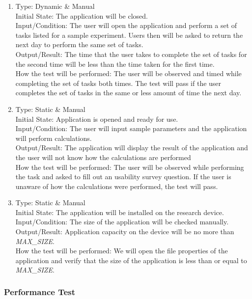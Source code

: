 \documentclass[12pt, titlepage]{article}
\begin{document}
\begin{adjustwidth}{2.2em}{0pt}
\begin{enumerate}[{NF-UT}1.]
  \item Type: Dynamic \& Manual\\ \label{UT4}
  Initial State: The application will be closed.\\
  Input/Condition: The user will open the application and perform a set of tasks listed for a sample experiment. Users then will be asked to return the next day to perform the same set of tasks.\\
  Output/Result:  The time that the user takes to complete the set of tasks for the second time will be less than the time taken for the first time.\\
  How the test will be performed: The user will be observed and timed while completing the set of tasks both times. The test will pass if the user completes the set of tasks in the same or less amount of time the next day.

  \item Type: Static \& Manual\\ \label{UT5}
  Initial State: Application is opened and ready for use.\\
  Input/Condition: The user will input sample parameters and the application will perform calculations.\\
  Output/Result: The application will display the result of the application and the user will not know how the calculations are performed \\
  How the test will be performed: The user will be observed while performing the task and asked to fill out an usability survey question. If the user is unaware of how the calculations were performed, the test will pass.

  \item Type: Static \& Manual\\ \label{UT6}
  Initial State: The application will be installed on the research device.\\
  Input/Condition: The size of the application will be checked manually.\\
  Output/Result: Application capacity on the device will be no more than \textsl{MAX\_SIZE}. \\
  How the test will be performed: We will open the file properties of the application and verify that the size of the application is less than or equal to \textsl{MAX\_SIZE}.
\end{enumerate}
\end{adjustwidth}

\subsubsection{Performance Test}
\end{document}
